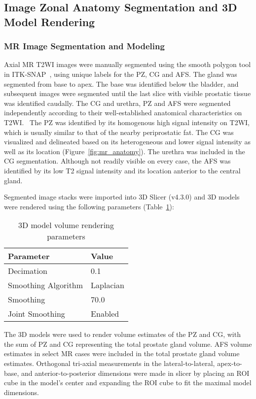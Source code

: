 \subsection{Image Zonal Anatomy Segmentation and 3D Model Rendering}
\subsubsection{MR Image Segmentation and Modeling}
Axial MR T2WI images were manually segmented using the smooth polygon tool in
ITK-SNAP~\cite{Yushkevich2006}, using unique labels for the PZ, CG and AFS. The
gland was segmented from base to apex.  The base was identified below the
bladder, and subsequent images were segmented until the last slice with visible
prostatic tissue was identified caudally. The CG and urethra, PZ and AFS were
segmented independently according to their well-established anatomical
characteristics on
T2WI.~\cite{Barentsz2012,Jung2012,Poon1985,Hricak2007,Bonekamp2011} The PZ was
identified by its homogenous high signal intensity on T2WI, which is usually
similar to that of the nearby periprostatic fat. The CG was visualized and
delineated based on its heterogeneous and lower signal intensity as well as its
location (Figure~\ref{fig:mr_anatomy}). The urethra was included in the CG
segmentation. Although not readily visible on every case, the AFS was
identified by its low T2 signal intensity and its location anterior to the
central gland. 

Segmented image stacks were imported into 3D Slicer (v4.3.0) and 3D
models were rendered using the following parameters (Table~\ref{tab:3dslicer}):

\begin{table}[h!]
\centering
\caption{3D model volume rendering parameters}
\begin{tabular}{ll}
{\bf Parameter} & {\bf Value} \\ \hline
Decimation & 0.1 \\
Smoothing Algorithm & Laplacian \\
Smoothing  & 70.0 \\
Joint Smoothing & Enabled \\
\end{tabular}
\label{tab:3dslicer}
\end{table}

The 3D models were used to render volume estimates of the PZ and CG, with the
sum of PZ and CG representing the total prostate gland volume. AFS volume
estimates in select MR cases were included in the total prostate gland volume
estimates. Orthogonal tri-axial measurements in the lateral-to-lateral,
apex-to-base, and anterior-to-posterior dimensions were made in slicer by
placing an ROI cube in the model's center and expanding the ROI cube to fit the
maximal model dimensions. 

